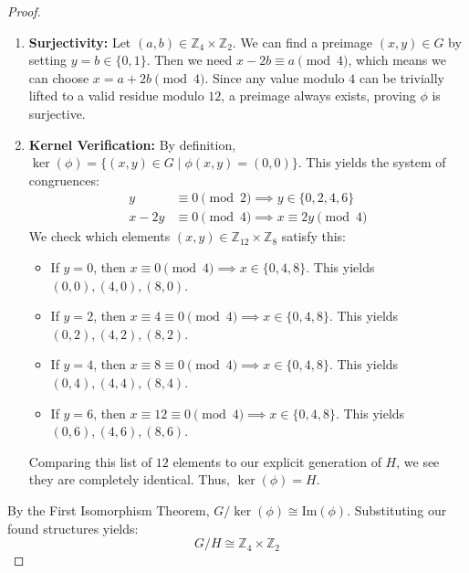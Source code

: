 \begin{proof}
\begin{enumerate}
    \item \textbf{Surjectivity:}
    Let $(a, b) \in \mathbb{Z}_4 \times \mathbb{Z}_2$. We can find a preimage $(x, y) \in G$ by setting $y = b \in \{0, 1\}$. Then we need $x - 2b \equiv a \pmod{4}$, which means we can choose $x = a + 2b \pmod{4}$. Since any value modulo $4$ can be trivially lifted to a valid residue modulo $12$, a preimage always exists, proving $\phi$ is surjective.

    \item \textbf{Kernel Verification:}
    By definition, $\ker(\phi) = \{ (x,y) \in G \mid \phi(x,y) = (0,0) \}$. This yields the system of congruences:
    \begin{align*}
    y &\equiv 0 \pmod{2} \implies y \in \{0, 2, 4, 6\} \\
    x - 2y &\equiv 0 \pmod{4} \implies x \equiv 2y \pmod{4}
    \end{align*}
    We check which elements $(x, y) \in \mathbb{Z}_{12} \times \mathbb{Z}_8$ satisfy this:
    \begin{itemize}
        \item If $y = 0$, then $x \equiv 0 \pmod{4} \implies x \in \{0, 4, 8\}$. This yields $(0,0), (4,0), (8,0)$.
        \item If $y = 2$, then $x \equiv 4 \equiv 0 \pmod{4} \implies x \in \{0, 4, 8\}$. This yields $(0,2), (4,2), (8,2)$.
        \item If $y = 4$, then $x \equiv 8 \equiv 0 \pmod{4} \implies x \in \{0, 4, 8\}$. This yields $(0,4), (4,4), (8,4)$.
        \item If $y = 6$, then $x \equiv 12 \equiv 0 \pmod{4} \implies x \in \{0, 4, 8\}$. This yields $(0,6), (4,6), (8,6)$.
    \end{itemize}
    Comparing this list of $12$ elements to our explicit generation of $H$, we see they are completely identical. Thus, $\ker(\phi) = H$.
\end{enumerate}

By the First Isomorphism Theorem, $G/\ker(\phi) \cong \text{Im}(\phi)$. Substituting our found structures yields:
\[
G/H \cong \mathbb{Z}_4 \times \mathbb{Z}_2
\]
\end{proof}

